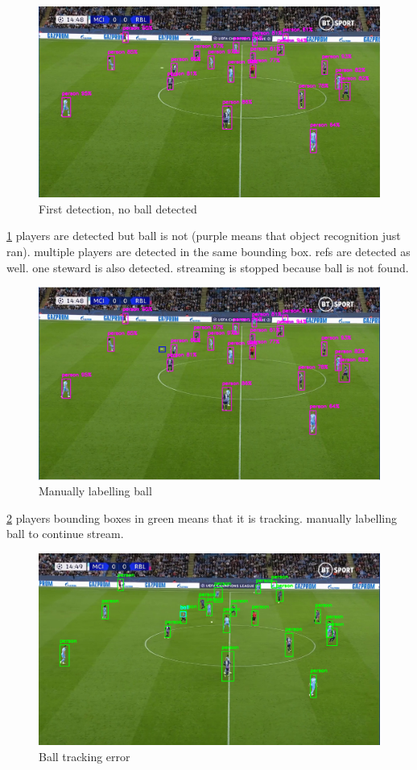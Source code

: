 \documentclass[
11pt,
twoside
]{report}
\begin{document}
\begin{figure}[H]
    \includegraphics[keepaspectratio, width=\columnwidth]{first.png}
    \caption{First detection, no ball detected}
    \label{img:1}
\end{figure}
\ref{img:1}
players are detected but ball is not (purple means that object recognition just ran). multiple players are detected in the same bounding box. refs are detected as well. one steward is also detected. streaming is stopped because ball is not found.
\begin{figure}[H]
    \includegraphics[keepaspectratio, width=\columnwidth]{Screenshot_2022-03-03_21-32-51.png}
    \caption{Manually labelling ball}
    \label{img:2}
\end{figure}
\ref{img:2} players bounding boxes in green means that it is tracking. manually labelling ball to continue stream.
\begin{figure}[H]
    \includegraphics[keepaspectratio, width=\columnwidth]{Screenshot_2022-03-03_21-35-39.png}
    \caption{Ball tracking error}
    \label{img:3}
\end{figure}
\end{document}
